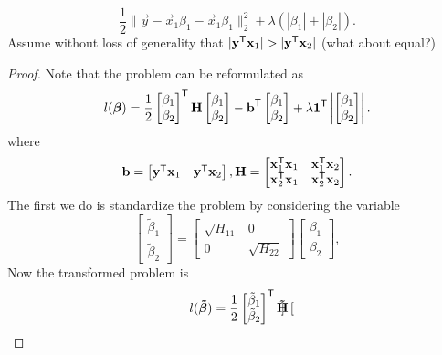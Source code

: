 \[
  \frac 1 2 \lVert \vec{y} - \vec{x}_1 \beta_1 -\vec{x}_1 \beta_1 \rVert_2^2 + \lambda \left( | \beta_1 | + |\beta_2| \right).
\]
Assume without loss of generality that $|\mv{y}^\T\mv{x}_1|> |\mv{y}^\T\mv{x}_2|$ (what about equal?)
\begin{proof}
  Note that the problem can be reformulated as
  \[ l({\boldsymbol{\mathrm{\beta}}}) =
    \frac 1 2 \begin{bmatrix}
      \beta_1 \\ \beta_2
    \end{bmatrix}^{\mathsf{T}} {\boldsymbol{\mathrm{H}}} \begin{bmatrix}
      \beta_1 \\ \beta_2
    \end{bmatrix}  -
    {\boldsymbol{\mathrm{b}}}^{\mathsf{T}} \begin{bmatrix}
      \beta_1 \\ \beta_2
    \end{bmatrix} + \lambda  {\boldsymbol{\mathrm{1}}}^{\mathsf{T}} \left| \begin{bmatrix}
      \beta_1 \\ \beta_2
    \end{bmatrix}  \right|.
  \]
  where
  $$
    {\boldsymbol{\mathrm{b}}} = \begin{bmatrix}
      {\boldsymbol{\mathrm{y}}}^{\mathsf{T}} {\boldsymbol{\mathrm{x}}}_1 & {\boldsymbol{\mathrm{y}}}^{\mathsf{T}} {\boldsymbol{\mathrm{x}}}_2
    \end{bmatrix} , {\boldsymbol{\mathrm{H}}}  =
    \begin{bmatrix}
      {\boldsymbol{\mathrm{x}}}_1^{\mathsf{T}} {\boldsymbol{\mathrm{x}}}_1 & {\boldsymbol{\mathrm{x}}}_1^{\mathsf{T}} {\boldsymbol{\mathrm{x}}}_2 \\
      {\boldsymbol{\mathrm{x}}}_2^{\mathsf{T}} {\boldsymbol{\mathrm{x}}}_1 & {\boldsymbol{\mathrm{x}}}_2^{\mathsf{T}} {\boldsymbol{\mathrm{x}}}_2 \\
    \end{bmatrix} .
  $$
  The first we do is standardize the problem by considering the variable
  $$
    \begin{bmatrix}
      \tilde	\beta_1 \\ \tilde \beta_2
    \end{bmatrix} =  \begin{bmatrix}
      \sqrt{H_{11}} & 0             \\
      0             & \sqrt{H_{22}}
    \end{bmatrix} \begin{bmatrix}
      \beta_1 \\ \beta_2
    \end{bmatrix},
  $$
  Now the transformed problem is
  \[ l( {\boldsymbol{\mathrm{\tilde \beta }}}) =
    \frac 1 2 \begin{bmatrix}
      \tilde	\beta_1 \\ \tilde \beta_2
    \end{bmatrix}^{\mathsf{T}}   {\boldsymbol{\mathrm{ \tilde H}}} \begin{bmatrix}

\end{bmatrix}\]
\end{proof}
